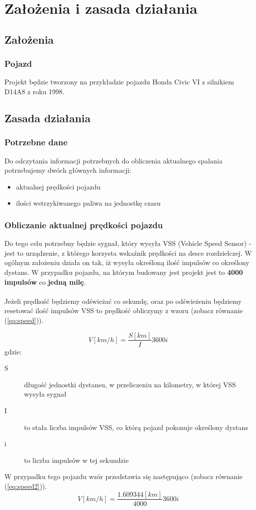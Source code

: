 \chapter{Założenia i zasada działania}
\section{Założenia}
\subsection{Pojazd}
Projekt będzie tworzony na przykładzie pojazdu Honda Civic VI z silnikiem D14A8 z roku 1998.

\section{Zasada działania}
\subsection{Potrzebne dane}
Do odczytania informacji potrzebnych do obliczenia aktualnego spalania potrzebujemy dwóch głównych informacji:
\begin{itemize}
\item{aktualnej prędkości pojazdu}
\item{ilości wstrzykiwanego paliwa na jednostkę czasu}
\end{itemize}

\subsection{Obliczanie aktualnej prędkości pojazdu} \label{calc_speed}
Do tego celu potrzebny będzie sygnał, który wysyła VSS (Vehicle Speed Sensor) - jest to urządzenie, z którego korzysta wskaźnik prędkości na desce rozdzielczej. W ogólnym założeniu działa on tak, iż wysyła określoną ilość impulsów co określony dystans. W przypadku pojazdu, na którym budowany jest projekt jest to \textbf{4000 impulsów} co \textbf{jedną milę}.\\
\\Jeżeli prędkość będziemy odświeżać co sekundę, oraz po odświeżeniu będziemy resetować ilość impulsów VSS to prędkość obliczymy z wzoru (zobacz równanie (\ref{eq:speed})).

\begin{equation}\label{eq:speed}
V[km/h] = \frac{S[km]}{I} 3600 i
\end{equation}
gdzie:
\begin{description}
\item[S] długość jednostki dystansu, w przeliczeniu na kilometry, w której VSS wysyła sygnał
\item[I] to stała liczba impulsów VSS, co którą pojazd pokonuje określony dystans
\item[i] to liczba impulsów w tej sekundzie
\end{description}
W przypadku tego pojazdu wzór przedstawia się następująco (zobacz równanie (\ref{eq:speed2})).
\begin{equation}\label{eq:speed2}
V[km/h] = \frac{1.609344[km]}{4000} 3600i
\end{equation}

